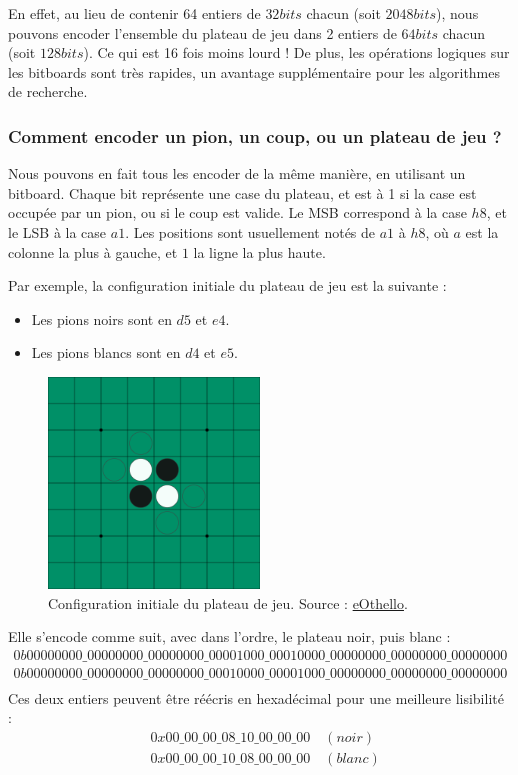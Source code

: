 En effet, au lieu de contenir 64 entiers de $32 bits$ chacun (soit $2048 bits$), nous pouvons encoder l'ensemble du plateau de jeu dans 2 entiers de $64 bits$ chacun (soit $128bits$). Ce qui est 16 fois moins lourd ! De plus, les opérations logiques sur les bitboards sont très rapides, un avantage supplémentaire pour les algorithmes de recherche.

\subsubsection{Comment encoder un pion, un coup, ou un plateau de jeu ?}
\label{subsubsec:enc}
Nous pouvons en fait tous les encoder de la même manière, en utilisant un bitboard. Chaque bit représente une case du plateau, et est à 1 si la case est occupée par un pion, ou si le coup est valide. Le \ac{MSB} correspond à la case $h8$, et le \ac{LSB} à la case $a1$. Les positions sont usuellement notés de $a1$ à $h8$, où $a$ est la colonne la plus à gauche, et $1$ la ligne la plus haute. \cite{brian_rose_2005} 

Par exemple, la configuration initiale du plateau de jeu est la suivante :
\begin{itemize}
    \item Les pions noirs sont en $d5$ et $e4$.
    \item Les pions blancs sont en $d4$ et $e5$.
\end{itemize}

\begin{figure}[H]
    \centering
    \includegraphics[width=0.5\textwidth]{ressources/plateau_init.png}
    \caption{Configuration initiale du plateau de jeu. Source : \href{https://www.eothello.com/}{eOthello}.}
    \label{fig:init_board}
\end{figure}

Elle s'encode comme suit, avec dans l'ordre, le plateau noir, puis blanc : 
\begin{align*}
0b00000000\_00000000\_00000000\_00001000\_00010000\_00000000\_00000000\_00000000 \\
0b00000000\_00000000\_00000000\_00010000\_00001000\_00000000\_00000000\_00000000 \\
\end{align*}
Ces deux entiers peuvent être réécris en hexadécimal pour une meilleure lisibilité :
\begin{align*}
    &0x00\_00\_00\_08\_10\_00\_00\_00 \quad (noir)\\
    &0x00\_00\_00\_10\_08\_00\_00\_00 \quad (blanc)\\
\end{align*}

